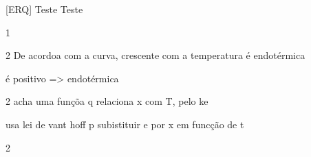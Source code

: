 \documentclass[\mainfilename]{subfiles}
\begin{document}

[ERQ]
{Teste} %
{Teste} %

\begin{questionBox}1{ %
} %
    \begin{questionBox}2{ %
    } %
        De acordoa com a curva, crescente com a temperatura é endotérmica
        \par
         é positivo => endotérmica
    \end{questionBox}
    \begin{questionBox}2{ %
    } %
        acha uma funçõa q relaciona x com T, pelo ke\par
        usa lei de vant hoff p subistituir e por x em funcção de t
    \end{questionBox}
    \begin{questionBox}2{ %
    } %
    \end{questionBox}
\end{questionBox}
\end{document}
